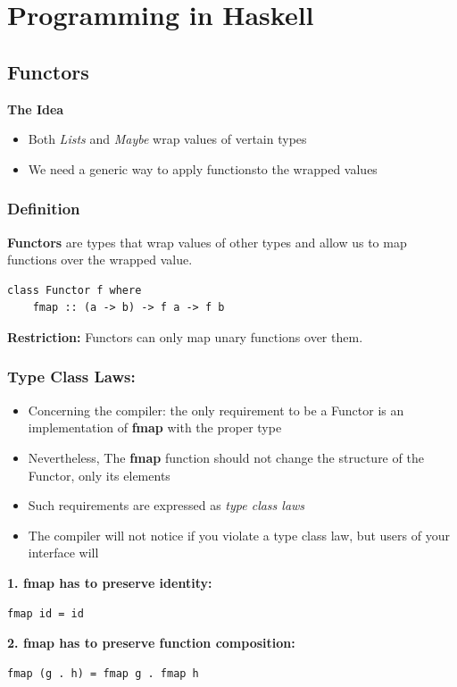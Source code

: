 
\section{Programming in Haskell}
\subsection{Functors}
\textbf{The Idea}
\begin{itemize}
    \item Both \textit{Lists} and \textit{Maybe} wrap values of vertain types
    \item We need a generic way to apply functionsto the wrapped values
\end{itemize}

\subsubsection{Definition}
\textbf{Functors} are types that wrap values of other types and allow us to map functions over the wrapped value.
\begin{lstlisting}
class Functor f where
    fmap :: (a -> b) -> f a -> f b
\end{lstlisting}
\textbf{Restriction:} Functors can only map unary functions over them.

\subsubsection{Type Class Laws:}
\begin{itemize}
    \item Concerning the compiler: the only requirement to be a Functor is an implementation of \textbf{fmap} with the proper type
    \item Nevertheless, The \textbf{fmap} function should not change the structure of the Functor, only its elements
    \item Such requirements are expressed as \textit{type class laws}
    \item The compiler will not notice if you violate a type class law, but users of your interface will
\end{itemize}
\textbf{1. fmap has to preserve identity:}
\begin{lstlisting}
fmap id = id
\end{lstlisting}
\textbf{2. fmap has to preserve function composition:}
\begin{lstlisting}
fmap (g . h) = fmap g . fmap h
\end{lstlisting}


